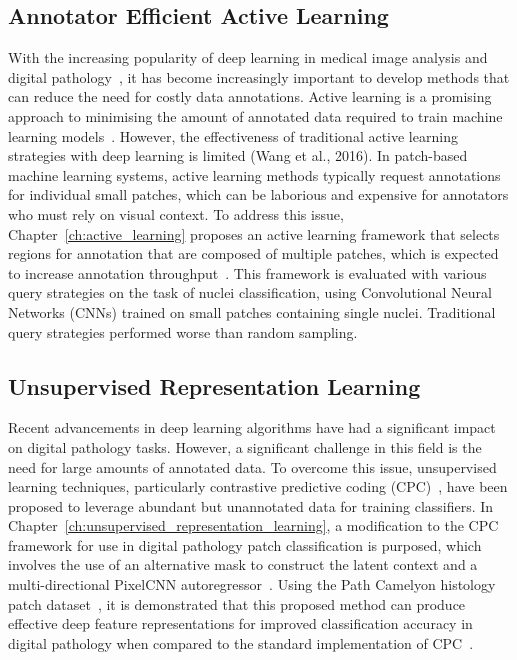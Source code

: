 \subsection*{Annotator Efficient Active Learning}
With the increasing popularity of deep learning in medical image analysis and digital pathology~\citep{tizhoosh2018artificial}, it has become increasingly important to develop methods that can reduce the need for costly data annotations. Active learning is a promising approach to minimising the amount of annotated data required to train machine learning models~\citep{settles2009active}. However, the effectiveness of traditional active learning strategies with deep learning is limited (Wang et al., 2016). In patch-based machine learning systems, active learning methods typically request annotations for individual small patches, which can be laborious and expensive for annotators who must rely on visual context. To address this issue, Chapter~\ref{ch:active_learning} proposes an active learning framework that selects regions for annotation that are composed of multiple patches, which is expected to increase annotation throughput~\citep{carse2019active}. This framework is evaluated with various query strategies on the task of nuclei classification, using Convolutional Neural Networks (CNNs) trained on small patches containing single nuclei. Traditional query strategies performed worse than random sampling.

\subsection*{Unsupervised Representation Learning}
Recent advancements in deep learning algorithms have had a significant impact on digital pathology tasks. However, a significant challenge in this field is the need for large amounts of annotated data. To overcome this issue, unsupervised learning techniques, particularly contrastive predictive coding (CPC)~\citep{oord2018representation}, have been proposed to leverage abundant but unannotated data for training classifiers. In Chapter~\ref{ch:unsupervised_representation_learning}, a modification to the CPC framework for use in digital pathology patch classification is purposed, which involves the use of an alternative mask to construct the latent context and a multi-directional PixelCNN autoregressor~\citep{oord2016pixel}. Using the Path Camelyon histology patch dataset~\citep{veeling2018rotation}, it is demonstrated that this proposed method can produce effective deep feature representations for improved classification accuracy in digital pathology when compared to the standard implementation of CPC~\citep{carse2021unsupervised}.

